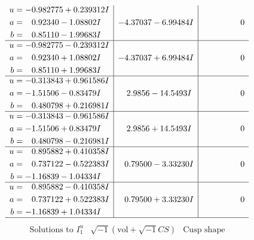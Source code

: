 \documentclass[1p]{elsarticle_modified}
\theoremstyle{definition}
\newcommand{\I}{\sqrt{-1}}
\begin{document}
$$\begin{array}{c|c|c}
\begin{aligned}
u &= -0.982775 + 0.239312 I \\
a &= \phantom{-}0.92340 - 1.08802 I \\
b &= \phantom{-}0.85110 - 1.99683 I\end{aligned}
 & -4.37037 - 6.99484 I & \phantom{-0.000000 } 0 \\ \hline\begin{aligned}
u &= -0.982775 - 0.239312 I \\
a &= \phantom{-}0.92340 + 1.08802 I \\
b &= \phantom{-}0.85110 + 1.99683 I\end{aligned}
 & -4.37037 + 6.99484 I & \phantom{-0.000000 } 0 \\ \hline\begin{aligned}
u &= -0.313843 + 0.961586 I \\
a &= -1.51506 - 0.83479 I \\
b &= \phantom{-}0.480798 + 0.216981 I\end{aligned}
 & \phantom{-}2.9856 - 14.5493 I & \phantom{-0.000000 } 0 \\ \hline\begin{aligned}
u &= -0.313843 - 0.961586 I \\
a &= -1.51506 + 0.83479 I \\
b &= \phantom{-}0.480798 - 0.216981 I\end{aligned}
 & \phantom{-}2.9856 + 14.5493 I & \phantom{-0.000000 } 0 \\ \hline\begin{aligned}
u &= \phantom{-}0.895882 + 0.410358 I \\
a &= \phantom{-}0.737122 - 0.522383 I \\
b &= -1.16839 - 1.04334 I\end{aligned}
 & \phantom{-}0.79500 - 3.33230 I & \phantom{-0.000000 } 0 \\ \hline\begin{aligned}
u &= \phantom{-}0.895882 - 0.410358 I \\
a &= \phantom{-}0.737122 + 0.522383 I \\
b &= -1.16839 + 1.04334 I\end{aligned}
 & \phantom{-}0.79500 + 3.33230 I & \phantom{-0.000000 } 0\\
 \hline 
 \end{array}$$\newpage$$\begin{array}{c|c|c}  
\text{Solutions to }I^u_{1}& \I (\text{vol} + \sqrt{-1}CS) & \text{Cusp shape}\\
 \hline 
\begin{aligned}

\end{aligned}
\end{array}$$
\end{document}
